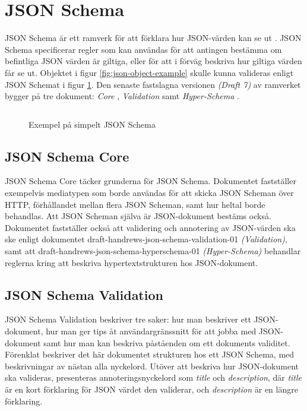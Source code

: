 \section{JSON Schema}
\label{sec:teori:schema}
JSON Schema är ett ramverk för att förklara hur JSON-värden kan se ut \cite[s.~1]{A.Wright}. JSON Schema specificerar regler som kan användas för att antingen bestämma om befintliga JSON värden är giltiga, eller för att i förväg beskriva hur giltiga värden får se ut. Objektet i figur \ref{fig:json-object-example} skulle kunna valideras enligt JSON Schemat i figur \ref{fig:json-schema-example}. Den senaste fastslagna versionen \textit{(Draft 7)} \cite{TheJSONSchemaorganisationa} av ramverket bygger på tre dokument: \textit{Core} \cite{A.Wright}, \textit{Validation} \cite{Andrews2018} samt \textit{Hyper-Schema} \cite{Andrews2018a}.

\begin{figure}
	\inputminted[tabsize=2, frame=single, fontsize=\small, framesep=2mm]{json}{code/simple/schema.json}
	\vspace{-1.7em}
	\caption{Exempel på simpelt JSON Schema}
	\label{fig:json-schema-example}
\end{figure}

\subsection{JSON Schema Core}
JSON Schema Core täcker grunderna för JSON Schema. Dokumentet fastställer exempelvis mediatypen som borde användas för att skicka JSON Scheman över HTTP, förhållandet mellan flera JSON Scheman, samt hur heltal borde behandlas. Att JSON Scheman själva är JSON-dokument bestäms också. Dokumentet fastställer också att validering och annotering av JSON-värden ska ske enligt dokumentet draft-handrews-json-schema-validation-01 \textit{(Validation)}, samt att draft-handrews-json-schema-hyperschema-01 \textit{(Hyper-Schema)} behandlar reglerna kring att beskriva hypertextstrukturen hos JSON-dokument. \cite[s.~1,~3-4,~10-11]{A.Wright}

\subsection{JSON Schema Validation}
JSON Schema Validation beskriver tre saker: hur man beskriver ett JSON-dokument, hur man ger tips åt användargränssnitt för att jobba med JSON-dokument samt hur man kan beskriva påståenden om ett dokuments validitet. Förenklat beskriver det här dokumentet strukturen hos ett JSON Schema, med beskrivningar av nästan alla nyckelord. Utöver att beskriva hur JSON-dokument ska valideras, presenteras annoteringsnyckelord som \textit{title} och \textit{description}, där \textit{title} är en kort förklaring för JSON värdet den validerar, och \textit{description} är en längre förklaring. \cite{Andrews2018}

